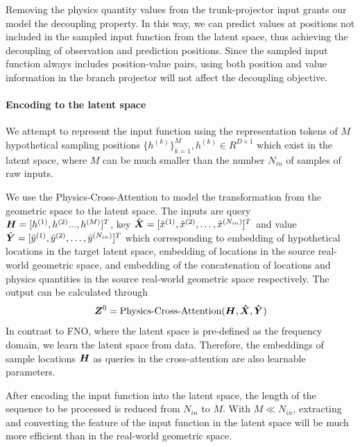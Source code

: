 \documentclass{article}
\begin{document}
Removing the physics quantity values from the trunk-projector input grants our model the decoupling property. In this way, we can predict values at positions not included in the sampled input function from the latent space, thus achieving the decoupling of observation and prediction positions. Since the sampled input function always includes position-value pairs, using both position and value information in the branch projector will not affect the decoupling objective.

\paragraph{Encoding to the latent space}
We attempt to represent the input function using the representation tokens of $M$ hypothetical sampling positions $\{h^{(k)}\}^{M}_{k=1},h^{(k)}\in R^{D\times 1}$ which exist in the latent space, where $M$ can be much smaller than the number $N_{in}$ of samples of raw inputs.

We use the Physics-Cross-Attention to model the transformation from the geometric space to the latent space. The inputs are query $\boldsymbol{H}=[h^{(1)},h^{(2)}...,h^{(M)}]^T$, key $\hat{\boldsymbol{X}}=[\hat{x}^{(1)}, \hat{x}^{(2)},\ldots,\hat{x}^{(N_{in})}]^T$ and value $\hat{\boldsymbol{Y}}=[\hat{y}^{(1)}, \hat{y}^{(2)},\ldots,\hat{y}^{(N_{in})}]^T$ which corresponding to embedding of hypothetical locations in the target latent space, embedding of locations in the source real-world geometric space, and embedding of the concatenation of locations and physics quantities in the source real-world geometric space respectively. The output can be calculated through
\begin{equation} \label{eq:encoder}
\boldsymbol{Z}^0 = {\rm Physics\text{-}Cross\text{-}Attention}(\boldsymbol{H}, \boldsymbol{\hat{X}}, \boldsymbol{\hat{Y}})%
\end{equation}
In contrast to FNO\cite{FNO}, where the latent space is pre-defined as the frequency domain, we learn the latent space from data. Therefore, the embeddings of sample locations $\boldsymbol{H}$ as queries in the cross-attention are also learnable parameters. 

After encoding the input function into the latent space, the length of the sequence to be processed is reduced from $N_{in}$ to $M$. With  $M\ll N_{in}$, extracting and converting the feature of the input function in the latent space will be much more efficient than in the real-world geometric space. 
\end{document}
